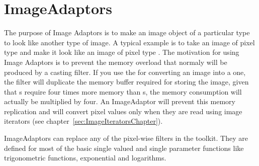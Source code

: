 
\chapter{ImageAdaptors}
\label{sec:ImageAdaptors}


The purpose of Image Adaptors is to make an image object of a particular type
to look like another type of image. A typical example is to take an image of
pixel type  and make it look like an image of pixel type
. The motivation for using Image Adaptors is to prevent the memory
overload that normaly will be produced by a casting filter. If you use the
 for converting an  image into a
 one, the filter will duplicate the memory buffer required for
storing the image, given that s require four times more memory than
s, the memory consumption will actually be multiplied by
four. An ImageAdaptor will prevent this memory replication and will convert
pixel values only when they are read using image iterators (see
chapter~\ref{sec:ImageIteratorsChapter}).

ImageAdaptors can replace any of the pixel-wise filters in the toolkit. They
are defined for most of the basic single valued and single parameter functions
like trigonometric functions, exponential and logarithms.

